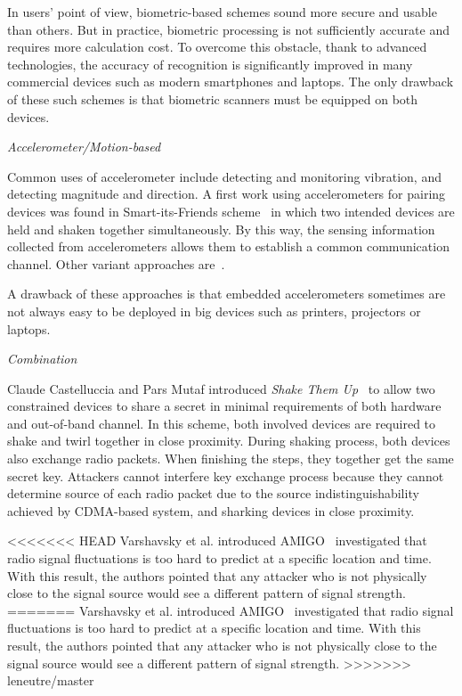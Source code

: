 In users' point of view, biometric-based schemes sound more secure and usable than others. But in practice, biometric processing is not sufficiently accurate and requires more calculation cost. To overcome this obstacle, thank to advanced technologies, the accuracy of recognition is significantly improved in many commercial devices such as modern smartphones and laptops. The only drawback of these such schemes is that biometric scanners must be equipped on both devices. 

\emph{Accelerometer/Motion-based}

Common uses of accelerometer include detecting and monitoring vibration, and detecting magnitude and direction. A first work using accelerometers for pairing devices was found in Smart-its-Friends scheme~\cite{Holmquist:2001kl} in which two intended devices are held and shaken together simultaneously. By this way, the sensing information collected from accelerometers allows them to establish a common communication channel. Other variant approaches are~\cite{Lester04areyou,Mayrhofer:2007oq,Studer:2011:DBS:2076732.2076780,Groza:2012:SSA:,Chong:2010:GUD:1851600.1851644, Chagnaadorj:2013aa}.

A drawback of these approaches is that embedded accelerometers sometimes are not always easy to be deployed in big devices such as printers, projectors or laptops.

\emph{Combination}

Claude Castelluccia and Pars Mutaf introduced \emph{Shake Them Up}~\cite{Castelluccia:2005} to allow two constrained devices to share a secret in minimal requirements of both hardware and out-of-band channel. In this scheme, both involved devices are required to shake and twirl together in close proximity. During shaking process, both devices also exchange radio packets. When finishing the steps, they together get the same secret key. Attackers cannot interfere key exchange process because they cannot determine source of each radio packet due to the source indistinguishability achieved by CDMA-based system, and sharking devices in close proximity. 

<<<<<<< HEAD
Varshavsky et al. introduced AMIGO~\cite{Scannell07amigo:proximity-based} investigated that radio signal fluctuations is too hard to predict at a specific location and time. With this result, the authors pointed that any attacker who is not physically close to the signal source would see a different pattern of signal strength.
=======
Varshavsky et al. introduced AMIGO~\cite{Scannell07amigo:proximity-based} investigated that radio signal fluctuations is too hard to predict at a specific location and time. With this result, the authors pointed that any attacker who is not physically close to the signal source would see a different pattern of signal strength. 
>>>>>>> leneutre/master


